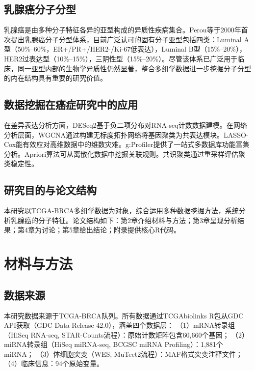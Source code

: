 \documentclass[12pt,a4paper]{ctexart}
\begin{document}
\subsection{乳腺癌分子分型}

乳腺癌是由多种分子特征各异的亚型构成的异质性疾病集合。Perou等\cite{perou2000molecular}于2000年首次提出乳腺癌分子分型体系，目前广泛认可的固有分子亚型包括四类：Luminal A型（50\%--60\%，ER+/PR+/HER2-/Ki-67低表达），Luminal B型（15\%--20\%），HER2过表达型（10\%--15\%），三阴性型（15\%--20\%）。尽管该体系已广泛用于临床，同一亚型内部的生物学异质性仍然显著，整合多组学数据进一步挖掘分子分型的内在结构具有重要的研究价值。

\subsection{数据挖掘在癌症研究中的应用}

在差异表达分析方面，DESeq2\cite{love2014moderated}基于负二项分布对RNA-seq计数数据建模。在网络分析层面，WGCNA\cite{langfelder2008wgcna}通过构建无标度拓扑网络将基因聚类为共表达模块。LASSO-Cox\cite{simon2011regularization}能有效应对高维数据中的维数灾难。g:Profiler\cite{kolberg2023gprofiler}提供了一站式多数据库功能富集分析。Apriori算法\cite{agrawal1994fast}可从离散化数据中挖掘关联规则。共识聚类\cite{wilkerson2010consensus}通过重采样评估聚类稳定性。

\subsection{研究目的与论文结构}

本研究以TCGA-BRCA多组学数据为对象，综合运用多种数据挖掘方法，系统分析乳腺癌的分子特征。论文结构如下：第2章介绍材料与方法；第3章呈现分析结果；第4章为讨论；第5章给出结论；附录提供核心R代码。

\section{材料与方法}

\subsection{数据来源}

本研究数据来源于TCGA-BRCA队列。所有数据通过TCGAbiolinks R包\cite{colaprico2016tcgabiolinks}从GDC API获取（GDC Data Release 42.0），涵盖四个数据层：
（1）mRNA转录组（HiSeq RNA-seq, STAR-Counts流程）：原始计数矩阵包含60,660个基因；
（2）miRNA转录组（HiSeq miRNA-seq, BCGSC miRNA Profiling）：1,881个miRNA；
（3）体细胞突变（WES, MuTect2流程）：MAF格式突变注释文件；
（4）临床信息：94个原始变量。
\end{document}
